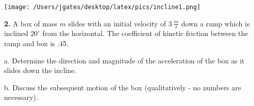 
\begin{floatingfigure}[r]{.25\textwidth}
\texttt{[image: /Users/jgates/desktop/latex/pics/incline1.png]}
\end{floatingfigure} 

{\bf \Large{2.}} A box of mass ${m}$ slides with an initial velocity of ${3~\tfrac{m}{s}}$ down a ramp which is inclined ${20^\circ}$ from the horizontal.  The coefficient of kinetic friction between the ramp and box is .45.

\bigskip

\indent  a. Determine the direction and magnitude of the acceleration of the box as it slides down the incline. 

\vfill

b. Discuss the subsequent motion of the box (qualitatively - no numbers are necessary).

\vspace{25mm}

\newpage